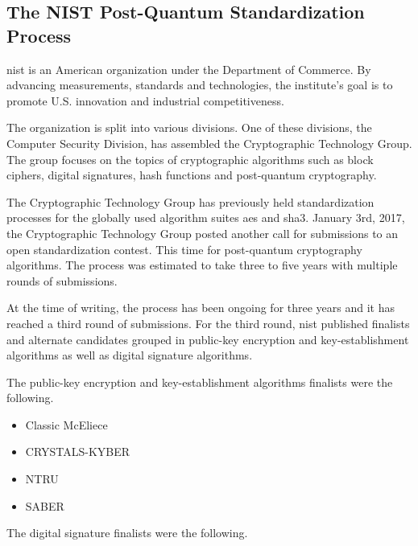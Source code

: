 
\subsection{The NIST Post-Quantum Standardization Process}
\acrfull{nist} is an American organization under the Department of Commerce. By advancing measurements, standards and technologies, the institute's goal is to promote U.S. innovation and industrial competitiveness\cite{nist:about}.

The organization is split into various divisions. One of these divisions, the Computer Security Division, has assembled the Cryptographic Technology Group. The group focuses on the topics of cryptographic algorithms such as block ciphers, digital signatures, hash functions and post-quantum cryptography\cite{nist:ct}.

The Cryptographic Technology Group has previously held standardization processes for the globally used algorithm suites \gls{aes} and \gls{sha3}. January 3rd, 2017, the Cryptographic Technology Group posted another call for submissions to an open standardization contest. This time for post-quantum cryptography algorithms. The process was estimated to take three to five years with multiple rounds of submissions\cite{nist:call-for-proposals}.

At the time of writing, the process has been ongoing for three years and it has reached a third round of submissions. For the third round, \gls{nist} published finalists and alternate candidates grouped in public-key encryption and key-establishment algorithms as well as digital signature algorithms\cite{nist:round-three-submissions}.

The public-key encryption and key-establishment algorithms finalists were the following. 

\begin{itemize}
    \item Classic McEliece
    \item CRYSTALS-KYBER
    \item NTRU
    \item SABER
\end{itemize}

The digital signature finalists were the following. 

